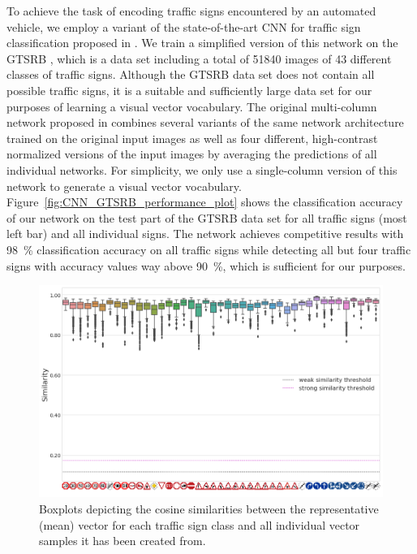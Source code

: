 To achieve the task of encoding traffic signs encountered by an automated vehicle, we employ a variant of the state-of-the-art \ac{CNN} for traffic sign classification proposed in \cite{Ciresan2012}.
We train a simplified version of this network on the \acf{GTSRB} \cite{Stallkamp2012}, which is a data set including a total of \num{51840} images of \num{43} different classes of traffic signs.
Although the \ac{GTSRB} data set does not contain all possible traffic signs, it is a suitable and sufficiently large data set for our purposes of learning a visual vector vocabulary.
The original multi-column network proposed in \cite{Ciresan2012} combines several variants of the same network architecture trained on the original input images as well as four different, high-contrast normalized versions of the input images by averaging the predictions of all individual networks.
For simplicity, we only use a single-column version of this network to generate a visual vector vocabulary. 
Figure~\ref{fig:CNN_GTSRB_performance_plot} shows the classification accuracy of our network on the test part of the \ac{GTSRB} data set for all traffic signs (most left bar) and all individual signs.
The network achieves competitive results with \SI{98}{\percent} classification accuracy on all traffic signs while detecting all but four traffic signs with accuracy values way above \SI{90}{\percent}, which is sufficient for our purposes.

\begin{figure}[t]
    \centering
    \includegraphics[width=0.9\linewidth]{imgs/Visual_vocab_traffic_signs_similarity_with_representative_vecs.png}
    \caption{Boxplots depicting the cosine similarities between the representative (mean) vector for each traffic sign class and all individual vector samples it has been created from.}
    \label{fig:visual_vocab_traffic_signs_similarity_with_representative_vecs}
\end{figure}

